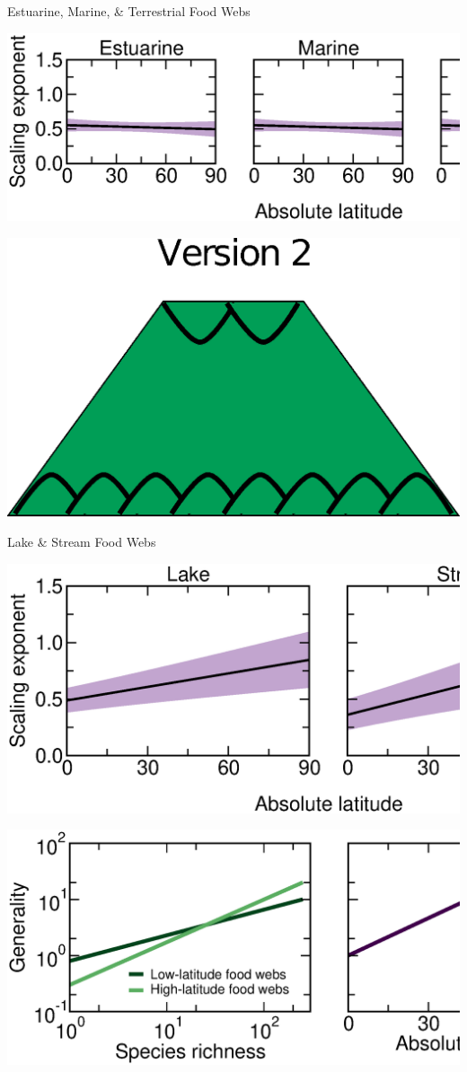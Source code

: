 \documentclass{beamer}
\begin{document}
  \begin{frame}{Estuarine, Marine, \& Terrestrial Food Webs}
    \begin{center}
      \includegraphics*[width=.9\textwidth]{Figures/results/no_effect.eps}

    \vspace{1.02cm}

    \includegraphics*[width=.4\textwidth]{Figures/version2.eps}

    \end{center}
  \end{frame}


  \begin{frame}{Lake \& Stream Food Webs}
    \begin{center}
      \includegraphics*[width=.75\textwidth]{Figures/results/effect.eps}

      \vspace{.5cm}

    \includegraphics*[width=.75\textwidth]{Figures/results/effect_interpretations.eps}

    \end{center}
  \end{frame}
\end{document}
